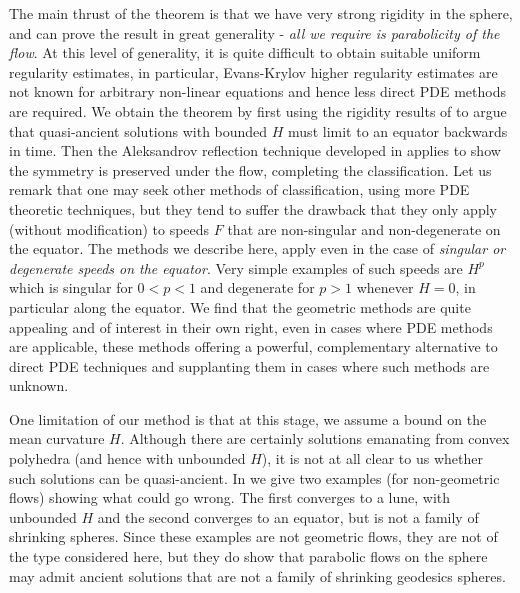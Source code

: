 \documentclass{amsart}
\begin{document}
The main thrust of the theorem is that we have very strong rigidity in the sphere, and can prove the result in great generality - \emph{all we require is parabolicity of the flow}. At this level of generality, it is quite difficult to obtain suitable uniform regularity estimates, in particular, Evans-Krylov higher regularity estimates are not known for arbitrary non-linear equations and hence less direct PDE methods are required. We obtain the theorem by first using the rigidity results of \cite{MakowskiScheuer:/2013} to argue that quasi-ancient solutions with bounded \(H\) must limit to an equator backwards in time. Then the Aleksandrov reflection technique developed in \cite{bryanlouie,2015arXiv150802821B} applies to show the symmetry is preserved under the flow, completing the classification. Let us remark that one may seek other methods of classification, using more PDE theoretic techniques, but they tend to suffer the drawback that they only apply (without modification) to speeds \(F\) that are non-singular and non-degenerate on the equator. The methods we describe here, apply even in the case of \emph{singular or degenerate speeds on the equator}. Very simple examples of such speeds are \(H^p\) which is singular for \(0 < p < 1\) and degenerate for \(p > 1\) whenever \(H = 0\), in particular along the equator. We find that the geometric methods are quite appealing and of interest in their own right, even in cases where PDE methods are applicable, these methods offering a powerful, complementary alternative to direct PDE techniques and supplanting them in cases where such methods are unknown.

One limitation of our method is that at this stage, we assume a bound on the mean curvature \(H\). Although there are certainly solutions emanating from convex polyhedra (and hence with unbounded \(H\)), it is not at all clear to us whether such solutions can be quasi-ancient. In  we give two examples (for non-geometric flows) showing what could go wrong. The first converges to a lune, with unbounded \(H\) and the second converges to an equator, but is not a family of shrinking spheres. Since these examples are not geometric flows, they are not of the type considered here, but they do show that parabolic flows on the sphere may admit ancient solutions that are not a family of shrinking geodesics spheres.
\end{document}
